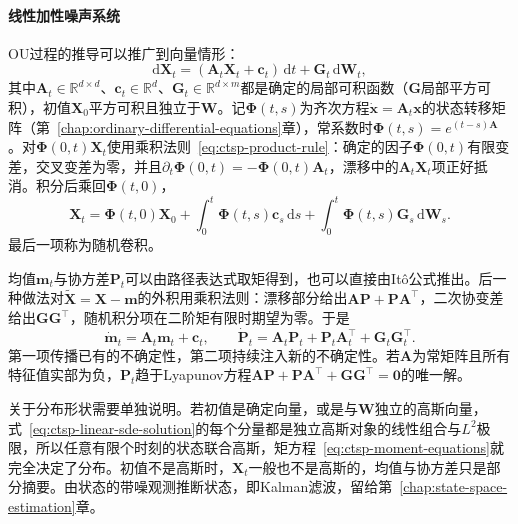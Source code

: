 \paragraph{线性加性噪声系统}
OU过程的推导可以推广到向量情形：
\begin{equation}
  \mathrm d\bm X_t=(\bm A_t\bm X_t+\bm c_t)\,\mathrm dt+\bm G_t\,\mathrm d\bm W_t ,
  \label{eq:ctsp-linear-sde}
\end{equation}
其中$\bm A_t\in\mathbb R^{d\times d}$、$\bm c_t\in\mathbb R^d$、$\bm G_t\in\mathbb R^{d\times m}$都是确定的局部可积函数（$\bm G$局部平方可积），初值$\bm X_0$平方可积且独立于$\bm W$。记$\bm\Phi(t,s)$为齐次方程$\dot{\bm x}=\bm A_t\bm x$的状态转移矩阵（第~\ref{chap:ordinary-differential-equations}章），常系数时$\bm\Phi(t,s)=e^{(t-s)\bm A}$。对$\bm\Phi(0,t)\bm X_t$使用乘积法则~\eqref{eq:ctsp-product-rule}：确定的因子$\bm\Phi(0,t)$有限变差，交叉变差为零，并且$\partial_t\bm\Phi(0,t)=-\bm\Phi(0,t)\bm A_t$，漂移中的$\bm A_t\bm X_t$项正好抵消。积分后乘回$\bm\Phi(t,0)$，
\begin{equation}
  \bm X_t=\bm\Phi(t,0)\bm X_0+\int_0^t\bm\Phi(t,s)\bm c_s\,\mathrm ds+\int_0^t\bm\Phi(t,s)\bm G_s\,\mathrm d\bm W_s .
  \label{eq:ctsp-linear-sde-solution}
\end{equation}
最后一项称为随机卷积。

均值$\bm m_t$与协方差$\bm P_t$可以由路径表达式取矩得到，也可以直接由Itô公式推出。后一种做法对$\widetilde{\bm X}=\bm X-\bm m$的外积用乘积法则：漂移部分给出$\bm A\bm P+\bm P\bm A^\top$，二次协变差给出$\bm G\bm G^\top$，随机积分项在二阶矩有限时期望为零。于是
\begin{equation}
  \dot{\bm m}_t=\bm A_t\bm m_t+\bm c_t,\qquad
  \dot{\bm P}_t=\bm A_t\bm P_t+\bm P_t\bm A_t^\top+\bm G_t\bm G_t^\top .
  \label{eq:ctsp-moment-equations}
\end{equation}
第一项传播已有的不确定性，第二项持续注入新的不确定性。若$\bm A$为常矩阵且所有特征值实部为负，$\bm P_t$趋于Lyapunov方程$\bm A\bm P+\bm P\bm A^\top+\bm G\bm G^\top=\bm0$的唯一解。

关于分布形状需要单独说明。若初值是确定向量，或是与$\bm W$独立的高斯向量，式~\eqref{eq:ctsp-linear-sde-solution}的每个分量都是独立高斯对象的线性组合与$L^2$极限，所以任意有限个时刻的状态联合高斯，矩方程~\eqref{eq:ctsp-moment-equations}就完全决定了分布。初值不是高斯时，$\bm X_t$一般也不是高斯的，均值与协方差只是部分摘要。由状态的带噪观测推断状态，即Kalman滤波，留给第~\ref{chap:state-space-estimation}章。

